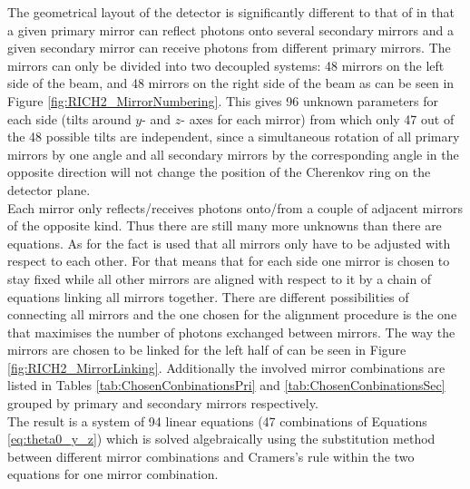 The geometrical layout of the \richtwo detector is significantly different to that of \richone in that a given primary mirror can reflect photons onto several secondary mirrors and a given secondary mirror can receive photons from different primary mirrors. The mirrors can only be divided into two decoupled systems: 48 mirrors on the left side of the beam, and 48 mirrors on the right side  of the beam as can be seen in Figure \ref{fig:RICH2_MirrorNumbering}. This gives 96 unknown parameters for each side (tilts around $y$- and $z$- axes for each mirror) from which only 47 out of the 48 possible tilts are independent, since a simultaneous rotation of all primary mirrors by one angle and all secondary mirrors by the corresponding angle in the opposite direction will not change the position of the Cherenkov ring on the detector plane.\\
Each mirror only reflects/receives photons onto/from a couple of adjacent mirrors of the opposite kind. Thus there are still many more unknowns than there are equations. As for \richone the fact is used that all mirrors only have to be adjusted with respect to each other. For \richtwo that means that for each side one mirror is chosen to stay fixed while all other mirrors are aligned with respect to it by a chain of equations linking all mirrors together. There are different possibilities of connecting all mirrors and the one chosen for the alignment procedure is the one that maximises the number of photons exchanged between mirrors. The way the mirrors are chosen to be linked for the left half of \richtwo can be seen in Figure \ref{fig:RICH2_MirrorLinking}. Additionally the involved mirror combinations are listed in Tables \ref{tab:ChosenConbinationsPri} and \ref{tab:ChosenConbinationsSec} grouped by primary and secondary mirrors respectively.\\
The result is a system of 94 linear equations (47 combinations of Equations \ref{eq:theta0_y_z}) which is solved algebraically using the substitution method between different mirror combinations and Cramers's rule within the two equations for one mirror combination.\\
